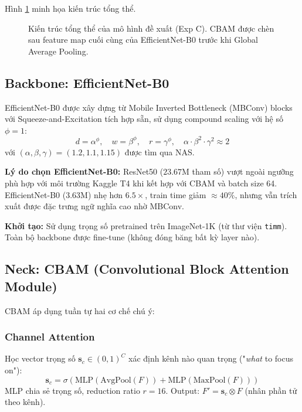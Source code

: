 \documentclass[conference]{IEEEtran}
\begin{document}
Hình \ref{fig:architecture} minh họa kiến trúc tổng thể.

\begin{figure}[t]
  \centering
  \caption{Kiến trúc tổng thể của mô hình đề xuất (Exp C).
           CBAM được chèn sau feature map cuối cùng của EfficientNet-B0
           trước khi Global Average Pooling.}
  \label{fig:architecture}
\end{figure}

\subsection{Backbone: EfficientNet-B0}

EfficientNet-B0 \cite{tan2019efficientnet} được xây dựng từ Mobile Inverted
Bottleneck (MBConv) blocks với Squeeze-and-Excitation tích hợp sẵn,
sử dụng compound scaling với hệ số $\phi = 1$:
\begin{equation}
  d = \alpha^\phi, \quad w = \beta^\phi, \quad r = \gamma^\phi,
  \quad \alpha\cdot\beta^2\cdot\gamma^2 \approx 2
  \label{eq:compound_scale}
\end{equation}
với $(\alpha, \beta, \gamma) = (1.2, 1.1, 1.15)$ được tìm qua NAS.

\textbf{Lý do chọn EfficientNet-B0:}
ResNet50 ($23.67\text{M}$ tham số) vượt ngoài ngưỡng phù hợp với môi trường
Kaggle T4 khi kết hợp với CBAM và batch size 64.
EfficientNet-B0 ($3.63\text{M}$) nhẹ hơn $6.5\times$, train time giảm $\approx 40\%$,
nhưng vẫn trích xuất được đặc trưng ngữ nghĩa cao nhờ MBConv.

\textbf{Khởi tạo:} Sử dụng trọng số pretrained trên ImageNet-1K (từ thư viện \texttt{timm}).
Toàn bộ backbone được fine-tune (không đóng băng bất kỳ layer nào).

\subsection{Neck: CBAM (Convolutional Block Attention Module)}

CBAM \cite{woo2018cbam} áp dụng tuần tự hai cơ chế chú ý:

\subsubsection{Channel Attention}
Học vector trọng số $\mathbf{s}_c \in (0,1)^C$ xác định kênh nào quan trọng
("\textit{what} to focus on"):
\begin{equation}
  \mathbf{s}_c = \sigma\!\left(
    \text{MLP}\!\left(\text{AvgPool}(F)\right) +
    \text{MLP}\!\left(\text{MaxPool}(F)\right)
  \right)
  \label{eq:channel_attn}
\end{equation}
MLP chia sẻ trọng số, reduction ratio $r=16$.
Output: $F' = \mathbf{s}_c \otimes F$ (nhân phần tử theo kênh).
\end{document}
